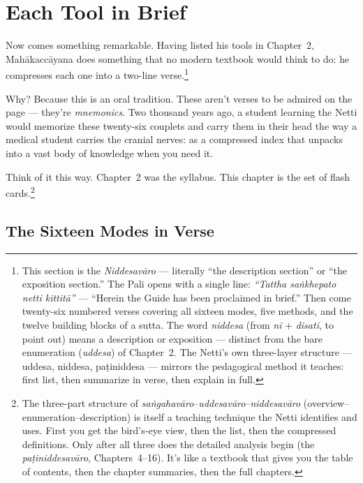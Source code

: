 \chapter{Each Tool in Brief}
\label{ch:each-tool-in-brief}

Now comes something remarkable. Having listed his tools in Chapter~2, Mahākaccāyana does something that no modern textbook would think to do: he compresses each one into a two-line verse.\footnote{This section is the \textit{Niddesavāro} --- literally ``the description section'' or ``the exposition section.'' The Pali opens with a single line: \textit{``Tattha saṅkhepato netti kittitā''} --- ``Herein the Guide has been proclaimed in brief.'' Then come twenty-six numbered verses covering all sixteen modes, five methods, and the twelve building blocks of a sutta. The word \textit{niddesa} (from \textit{ni} + \textit{disati}, to point out) means a description or exposition --- distinct from the bare enumeration (\textit{uddesa}) of Chapter~2. The Netti's own three-layer structure --- uddesa, niddesa, paṭiniddesa --- mirrors the pedagogical method it teaches: first list, then summarize in verse, then explain in full.}

Why? Because this is an oral tradition. These aren't verses to be admired on the page --- they're \textit{mnemonics}. Two thousand years ago, a student learning the Netti would memorize these twenty-six couplets and carry them in their head the way a medical student carries the cranial nerves: as a compressed index that unpacks into a vast body of knowledge when you need it.

Think of it this way. Chapter~2 was the syllabus. This chapter is the set of flash cards.\footnote{The three-part structure of \textit{saṅgahavāro}--\textit{uddesavāro}--\textit{niddesavāro} (overview--enumeration--description) is itself a teaching technique the Netti identifies and uses. First you get the bird's-eye view, then the list, then the compressed definitions. Only after all three does the detailed analysis begin (the \textit{paṭiniddesavāro}, Chapters~4--16). It's like a textbook that gives you the table of contents, then the chapter summaries, then the full chapters.}

\ornament

\section*{The Sixteen Modes in Verse}

